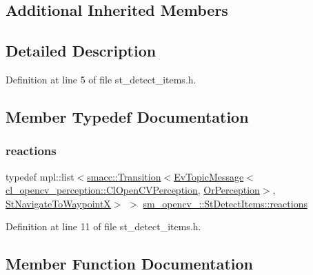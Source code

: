 \subsection*{Additional Inherited Members}


\subsection{Detailed Description}


Definition at line 5 of file st\+\_\+detect\+\_\+items.\+h.



\subsection{Member Typedef Documentation}
\mbox{\label{structsm__opencv__3_1_1StDetectItems_a4232e22dc3267f04cd94d57ed6e1b7ac}} 
\subsubsection{\texorpdfstring{reactions}{reactions}}
{\footnotesize\ttfamily typedef mpl\+::list$<$\hyperlink{classsmacc_1_1Transition}{smacc\+::\+Transition}$<$\hyperlink{structsmacc_1_1default__events_1_1EvTopicMessage}{Ev\+Topic\+Message}$<$\hyperlink{classsm__opencv__3_1_1cl__opencv__perception_1_1ClOpenCVPerception}{cl\+\_\+opencv\+\_\+perception\+::\+Cl\+Open\+C\+V\+Perception}, \hyperlink{classsm__opencv__3_1_1OrPerception}{Or\+Perception}$>$, \hyperlink{structsm__opencv__3_1_1StNavigateToWaypointX}{St\+Navigate\+To\+WaypointX}$>$ $>$ \hyperlink{structsm__opencv__3_1_1StDetectItems_a4232e22dc3267f04cd94d57ed6e1b7ac}{sm\+\_\+opencv\+\_\+::\+St\+Detect\+Items\+::reactions}}



Definition at line 11 of file st\+\_\+detect\+\_\+items.\+h.



\subsection{Member Function Documentation}
\mbox{\label{structsm__opencv__3_1_1StDetectItems_a17b185c3c2cc61ffc8320ce12a4c5f5a}} 
